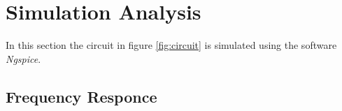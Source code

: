 \section{Simulation Analysis}
\label{sec:simulation}

In this section the circuit in figure \ref{fig:circuit} is simulated
using the software \textit{Ngspice}.



\subsection{Frequency Responce}















